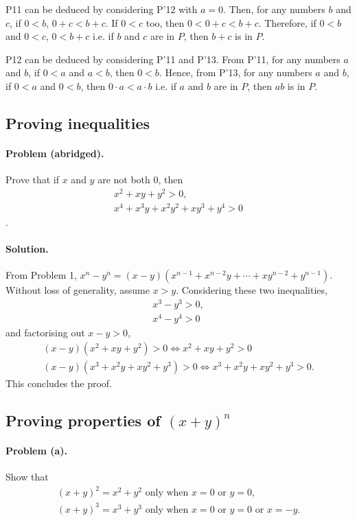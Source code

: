 \documentclass{article}
\begin{document}
P11 can be deduced by considering P'12 with $a = 0$. Then, for any numbers $b$ and $c$, if $0 < b$, $0 + c < b + c$. If $0 < c$ too, then $0 < 0 + c < b + c$. Therefore, if $0 < b$ and $0 < c$, $0 < b + c$ i.e. if $b$ and $c$ are in $P$, then $b + c$ is in $P$.

P12 can be deduced by considering P'11 and P'13. From P'11, for any numbers $a$ and $b$, if $0 < a$ and $a < b$, then $0 < b$. Hence, from P'13, for any numbers $a$ and $b$, if $0 < a$ and $0 < b$, then $0 \cdot a < a \cdot b$ i.e. if $a$ and $b$ are in $P$, then $ab$ is in $P$.

\setcounter{subsection}{14}
\subsection{Proving inequalities}

\paragraph{Problem (abridged).} Prove that if $x$ and $y$ are not both 0, then \begin{gather*}
  x^2 + xy + y^2 > 0, \\
  x^4 + x^3y + x^2y^2 + xy^3 + y^4 > 0
\end{gather*}.

\paragraph{Solution.} From Problem 1, $x^n - y^n = (x - y)(x^{n-1} + x^{n-2}y + \cdots + xy^{n-2} + y^{n-1})$. Without loss of generality, assume $x > y$. Considering these two inequalities, \begin{gather*}
  x^3 - y^3 > 0, \\
  x^4 - y^4 > 0
\end{gather*} and factorising out $x - y > 0$, \begin{gather*}
  (x - y)(x^2 + xy + y^2) > 0 \iff x^2 + xy + y^2 > 0 \\
  (x - y)(x^3 + x^2y + xy^2 + y^3) > 0 \iff x^3 + x^2y + xy^2 + y^3 > 0.
\end{gather*} This concludes the proof.

\setcounter{subsection}{15}
\subsection{Proving properties of $(x + y )^n$}

\paragraph{Problem (a).} Show that \begin{gather*}
  (x + y)^2 = x^2 + y^2 \text{ only when } x = 0 \text{ or } y = 0, \\
  (x + y)^3 = x^3 + y^3 \text{ only when } x = 0 \text{ or } y = 0 \text{ or } x = -y.
\end{gather*}
\end{document}
